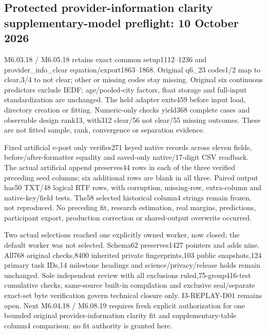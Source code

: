 \documentclass[11pt,a4paper]{article}
\begin{document}
\subsection*{Protected provider-information clarity supplementary-model preflight: 10 October 2026}
M6.03.18 / M6.05.18 retains exact common setup1112--1236 and provider\_info\_clear equation/export1863--1868. Original q6\_23 codes1/2 map to clear,3/4 to not clear; other or missing codes stay missing. Original six continuous predictors exclude IEDF; age/pooled-city factors, float storage and full-input standardization are unchanged. The held adapter exits459 before input load, directory creation or fitting. Numeric-only checks yield368 complete cases and observable design rank13, with312 clear/56 not clear/55 missing outcomes. These are not fitted sample, rank, convergence or separation evidence.

Fixed artificial e-post only verifies271 keyed native records across eleven fields, before/after-formatter equality and saved-only native/17-digit CSV readback. The actual artificial append preserves44 rows in each of the three verified preceding seed columns; six additional rows are blank in all three. Paired output has50 TXT/48 logical RTF rows, with corruption, missing-row, extra-column and native-key/field tests. The58 selected historical column4 strings remain frozen, not reproduced. No preceding fit, research estimation, real margins, predictions, participant export, production correction or shared-output overwrite occurred.

Two actual selections reached one explicitly owned worker, now closed; the default worker was not selected. Schema62 preserves1427 pointers and adds nine. All768 original checks,8400 inherited private fingerprints,103 public snapshots,124 primary task IDs,14 milestone headings and science/privacy/release holds remain unchanged. Sole independent review with all exclusions ruled,75-group416-test cumulative checks, same-source built-in compilation and exclusive seal/separate exact-set byte verification govern technical closure only. I3-REPLAY-D01 remains open. Next M6.04.18 / M6.08.19 requires fresh explicit authorization for one bounded original provider-information clarity fit and supplementary-table column4 comparison; no fit authority is granted here.
\end{document}
